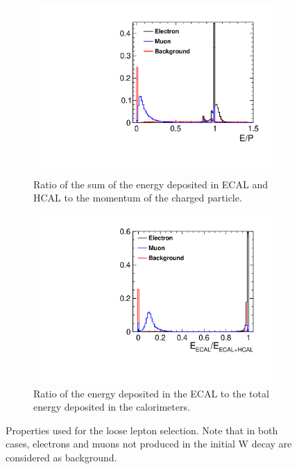\begin{figure}
  \centering
  \begin{subfigure}[t]{.48\textwidth}
    \centering
    \includegraphics[width=1.0\linewidth,keepaspectratio]{HiggsAnalysis/figures/EByP}
    \caption{Ratio of the sum of the energy deposited in ECAL and HCAL to the momentum of the charged particle.}
  \end{subfigure}%
    \vspace{4ex}
  \begin{subfigure}[t]{.48\textwidth}
    \centering
    \includegraphics[width=1.0\linewidth,keepaspectratio]{HiggsAnalysis/figures/ECALByE}
    \caption{Ratio of the energy deposited in the ECAL to the total energy deposited in the calorimeters. }
  \end{subfigure}
  \caption[Parameters used for loose lepton selection]{Properties used for the loose lepton selection.  Note that in both cases, electrons and muons not produced in the initial W decay are considered as background.}
  \label{fig:lepfinding}
\end{figure}

